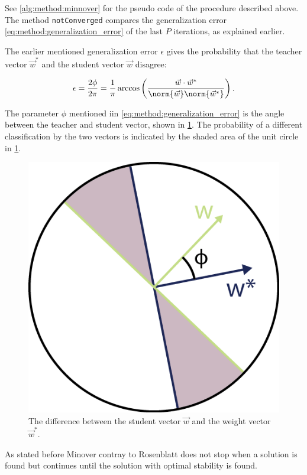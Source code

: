 See \autoref{alg:method:minnover} for the pseudo code of the procedure described above. The method \texttt{notConverged} compares the generalization error \eqref{eq:method:generalization_error} of the last $P$ iterations, as explained earlier. 



The earlier mentioned generalization error $\epsilon$ gives the probability that the teacher vector $\vec{w}^*$ and the student vector $\vec{w}$ disagree:

\begin{equation}\label{eq:method:generalization_error}
	\epsilon = \frac{2\phi}{2\pi} = \frac{1}{\pi} \arccos \left(\frac{\vec{w} \cdot \vec{w}^*}{\norm{\vec{w}} \norm{\vec{w}^*}}\right).
\end{equation}

The parameter $\phi$ mentioned iin \eqref{eq:method:generalization_error} is the angle between the teacher and student vector, shown in \cref{fig:methode:generalizationError}. The probability of a different classification by the two vectors is indicated by the shaded area of the unit circle in \cref{fig:methode:generalizationError}.\\

\begin{figure}
	\centering
	\includegraphics[scale=1]{./img/generalizationError}
	\caption{The difference between the student vector $\vec{w}$ and the weight vector $\vec{w}^*$.}
	\label{fig:methode:generalizationError}
\end{figure}

As stated before Minover contray to Rosenblatt does not stop when a solution is found but continues until the solution with optimal stability is found.

